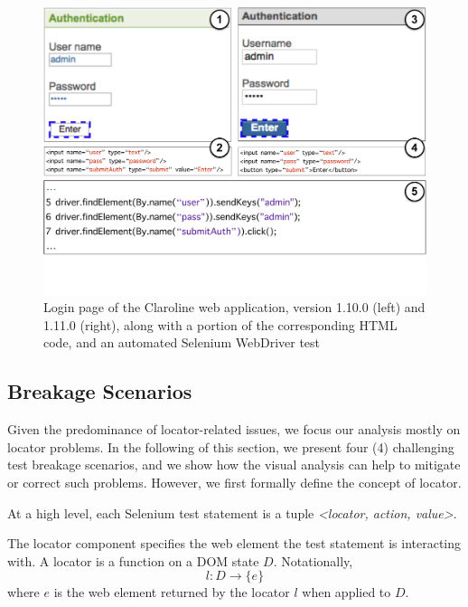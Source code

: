 \begin{figure}[t]
\centering
\includegraphics[trim={0cm 3.5cm 0cm 0cm},clip,scale=0.24]{images/claroline-together-3}
\caption{Login page of the Claroline web application, version 1.10.0 (left) and 1.11.0 (right), along with a portion of the corresponding HTML code, and an automated Selenium WebDriver test}
\label{claroline-together}
\end{figure}

\subsection{Breakage Scenarios}\label{sec:breakage-scenarios}

Given the predominance of locator-related issues, we focus our analysis mostly on locator problems. In the following of this section, we present four (4) challenging test breakage scenarios, and we show how the visual analysis can help to mitigate or correct such problems. However, we first formally define the concept of locator.

\begin{defn}
At a high level, each Selenium test statement is a tuple \textit{<locator, action, value>}.
\end{defn}

\begin{defn} 
The locator component specifies the web element the test statement is interacting with. A locator is a function on a DOM state $D$. Notationally, $$l: D \rightarrow \{e\}$$ where $e$ is the web element returned by the locator $l$ when applied to $D$. 
\end{defn}

